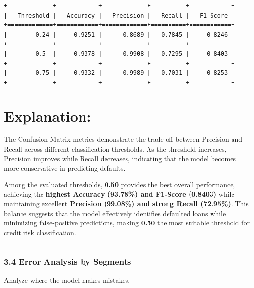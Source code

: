 \documentclass[11pt]{article}
\begin{document}
    \begin{Verbatim}[commandchars=\\\{\}]
+-------------+------------+-------------+----------+------------+
|   Threshold |   Accuracy |   Precision |   Recall |   F1-Score |
+=============+============+=============+==========+============+
|        0.24 |     0.9251 |      0.8689 |   0.7845 |     0.8246 |
+-------------+------------+-------------+----------+------------+
|        0.5  |     0.9378 |      0.9908 |   0.7295 |     0.8403 |
+-------------+------------+-------------+----------+------------+
|        0.75 |     0.9332 |      0.9989 |   0.7031 |     0.8253 |
+-------------+------------+-------------+----------+------------+
    \end{Verbatim}

    \section{Explanation:}\label{explanation}

The Confusion Matrix metrics demonstrate the trade-off between Precision
and Recall across different classification thresholds. As the threshold
increases, Precision improves while Recall decreases, indicating that
the model becomes more conservative in predicting defaults.

Among the evaluated thresholds, \textbf{0.50} provides the best overall
performance, achieving the \textbf{highest Accuracy (93.78\%) and
F1-Score (0.8403)} while maintaining excellent \textbf{Precision
(99.08\%) and strong Recall (72.95\%)}. This balance suggests that the
model effectively identifies defaulted loans while minimizing
false-positive predictions, making \textbf{0.50} the most suitable
threshold for credit risk classification.

    \begin{center}\rule{0.5\linewidth}{0.5pt}\end{center}

\subsubsection{3.4 Error Analysis by
Segments}\label{error-analysis-by-segments}

Analyze where the model makes mistakes.
\end{document}
